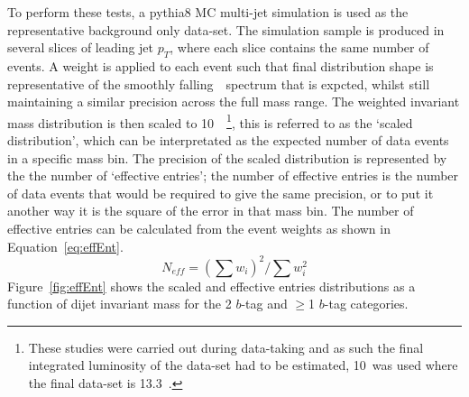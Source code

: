 To perform these tests, a {\sc pythia}8 MC multi-jet simulation is used as the representative background only data-set.
The simulation sample is produced in several slices of leading jet $p_{T}$, where each slice contains the same number of events.
A weight is applied to each event such that final distribution shape is representative of the smoothly falling~\mjj~spectrum that is expcted,
whilst still maintaining a similar precision across the full mass range.
The weighted invariant mass distribution is then scaled to 10~\ifb~\footnote{
  These studies were carried out during data-taking
  and as such the final integrated luminosity of the data-set had to be estimated,
  10~\ifb was used where the final data-set is 13.3~\ifb.
},
this is referred to as the  `scaled distribution', which can be interpretated as the expected number of data events in a specific mass bin. 
The precision of the scaled distribution is represented by the the number of `effective entries';
the number of effective entries is the number of data events that would be required to give the same precision,
or to put it another way it is the square of the error in that mass bin. The number of effective entries can be calculated from the event weights as shown in Equation~\ref{eq:effEnt}.
\begin{equation}
  N_{eff} = (\sum{w_i})^2 / \sum{w_i^2}
  \label{eq:effEnt}
\end{equation}
Figure~\ref{fig:effEnt} shows the scaled and effective entries distributions as a function of dijet invariant mass for the 2 $b$-tag and $\geq$1 $b$-tag categories. 

